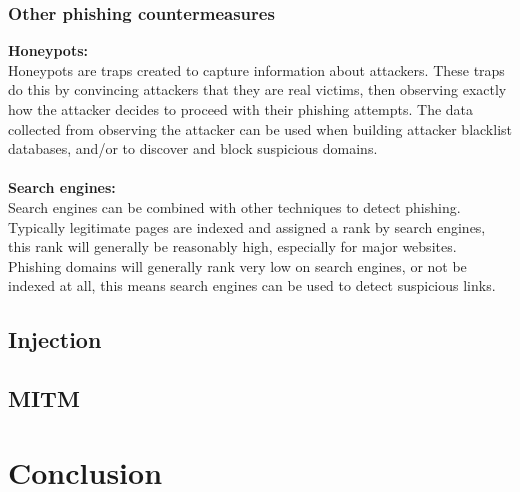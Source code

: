 \documentclass[11pt]{article}
\begin{document}
\subsubsection{Other phishing countermeasures}
\large{\textbf{Honeypots:}}\\
Honeypots are traps created to capture information about attackers. These traps do this by convincing attackers that they are real victims, then observing exactly how the attacker decides to proceed with their phishing attempts. The data collected from observing the attacker can be used when building attacker blacklist databases, and/or to discover and block suspicious domains.\\\\
\large{\textbf{Search engines:}}\\
Search engines can be combined with other techniques to detect phishing. Typically legitimate pages are indexed and assigned a rank by search engines, this rank will generally be reasonably high, especially for major websites. Phishing domains will generally rank very low on search engines, or not be indexed at all, this means search engines can be used to detect suspicious links.

\subsection{Injection}
\subsection{MITM}


\section{Conclusion} \label{CONCL}




\end{document}
